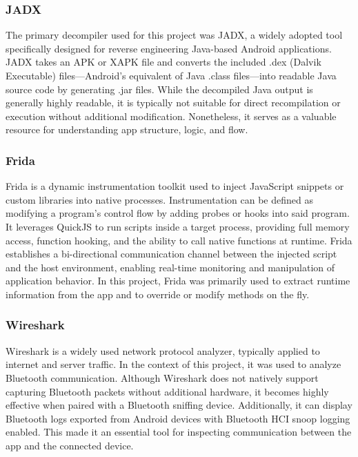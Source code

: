 \subsubsection{JADX}
The primary decompiler used for this project was JADX, a widely adopted tool specifically designed for reverse engineering Java-based Android applications. JADX takes an APK or XAPK file and converts the included .dex (Dalvik Executable) files—Android’s equivalent of Java .class files—into readable Java source code by generating .jar files. While the decompiled Java output is generally highly readable, it is typically not suitable for direct recompilation or execution without additional modification. Nonetheless, it serves as a valuable resource for understanding app structure, logic, and flow.

\subsubsection{Frida}
Frida is a dynamic instrumentation toolkit used to inject JavaScript snippets or custom libraries into native processes. Instrumentation can be defined as modifying a program's control flow by adding probes or hooks into said program.  It leverages QuickJS to run scripts inside a target process, providing full memory access, function hooking, and the ability to call native functions at runtime. Frida establishes a bi-directional communication channel between the injected script and the host environment, enabling real-time monitoring and manipulation of application behavior. In this project, Frida was primarily used to extract runtime information from the app and to override or modify methods on the fly.

\subsubsection{Wireshark}
Wireshark is a widely used network protocol analyzer, typically applied to internet and server traffic. In the context of this project, it was used to analyze Bluetooth communication. Although Wireshark does not natively support capturing Bluetooth packets without additional hardware, it becomes highly effective when paired with a Bluetooth sniffing device. Additionally, it can display Bluetooth logs exported from Android devices with Bluetooth HCI snoop logging enabled. This made it an essential tool for inspecting communication between the app and the connected device.